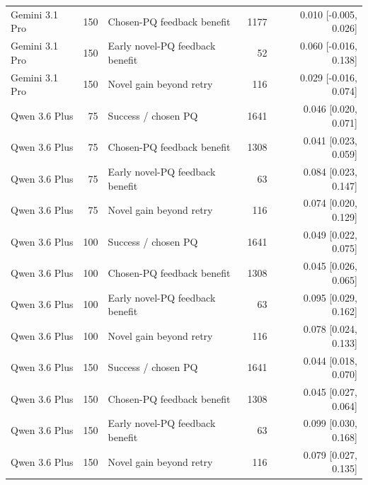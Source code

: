 \begin{tabular}{lrlrr}
Gemini 3.1 Pro & 150 & Chosen-PQ feedback benefit & 1177 & 0.010 [-0.005, 0.026] \\
Gemini 3.1 Pro & 150 & Early novel-PQ feedback benefit & 52 & 0.060 [-0.016, 0.138] \\
Gemini 3.1 Pro & 150 & Novel gain beyond retry & 116 & 0.029 [-0.016, 0.074] \\
Qwen 3.6 Plus & 75 & Success / chosen PQ & 1641 & 0.046 [0.020, 0.071] \\
Qwen 3.6 Plus & 75 & Chosen-PQ feedback benefit & 1308 & 0.041 [0.023, 0.059] \\
Qwen 3.6 Plus & 75 & Early novel-PQ feedback benefit & 63 & 0.084 [0.023, 0.147] \\
Qwen 3.6 Plus & 75 & Novel gain beyond retry & 116 & 0.074 [0.020, 0.129] \\
Qwen 3.6 Plus & 100 & Success / chosen PQ & 1641 & 0.049 [0.022, 0.075] \\
Qwen 3.6 Plus & 100 & Chosen-PQ feedback benefit & 1308 & 0.045 [0.026, 0.065] \\
Qwen 3.6 Plus & 100 & Early novel-PQ feedback benefit & 63 & 0.095 [0.029, 0.162] \\
Qwen 3.6 Plus & 100 & Novel gain beyond retry & 116 & 0.078 [0.024, 0.133] \\
Qwen 3.6 Plus & 150 & Success / chosen PQ & 1641 & 0.044 [0.018, 0.070] \\
Qwen 3.6 Plus & 150 & Chosen-PQ feedback benefit & 1308 & 0.045 [0.027, 0.064] \\
Qwen 3.6 Plus & 150 & Early novel-PQ feedback benefit & 63 & 0.099 [0.030, 0.168] \\
Qwen 3.6 Plus & 150 & Novel gain beyond retry & 116 & 0.079 [0.027, 0.135] \\
\bottomrule
\end{tabular}
